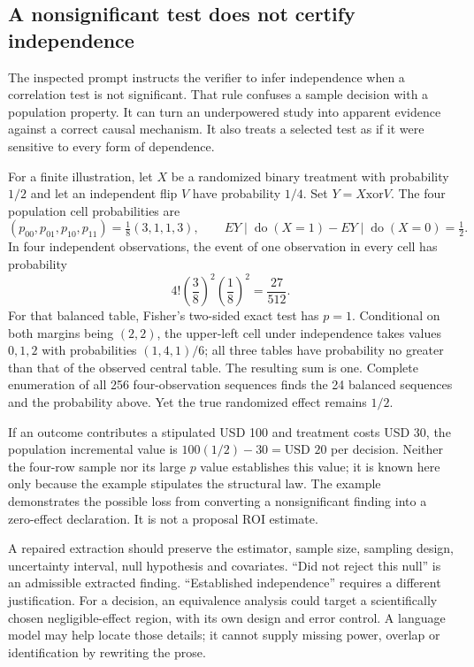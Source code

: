 \subsection{A nonsignificant test does not certify independence}

The inspected prompt instructs the verifier to infer independence when a
correlation test is not significant. That rule confuses a sample decision
with a population property. It can turn an underpowered study into apparent
evidence against a correct causal mechanism. It also treats a selected test
as if it were sensitive to every form of dependence.
\citep{exec17_benchmark_consistency}

For a finite illustration, let $X$ be a randomized binary treatment with
probability $1/2$ and let an independent flip $V$ have probability $1/4$.
Set $Y=X\mathbin{\mathrm{xor}}V$. The four population cell probabilities are
\begin{equation}
 (p_{00},p_{01},p_{10},p_{11})=\tfrac18(3,1,1,3),
 \qquad E{Y\mid\operatorname{do}(X=1)}
       -E{Y\mid\operatorname{do}(X=0)}=\tfrac12.
\label{exec17:validity-binary}
\end{equation}
In four independent observations, the event of one observation in every cell
has probability
\begin{equation}
 4!\left(\frac38\right)^2\left(\frac18\right)^2
       =\frac{27}{512}.
\label{exec17:validity-balanced}
\end{equation}
For that balanced table, Fisher's two-sided exact test has $p=1$. Conditional
on both margins being $(2,2)$, the upper-left cell under independence takes
values $0,1,2$ with probabilities $(1,4,1)/6$; all three tables have probability
no greater than that of the observed central table. The resulting sum is one.
Complete enumeration of all 256 four-observation sequences finds the 24
balanced sequences and the probability above. Yet the true randomized effect
remains $1/2$.~\citep{exec17_advice_validity_exact}

If an outcome contributes a stipulated USD 100 and treatment costs USD 30, the
population incremental value is $100(1/2)-30=\text{USD }20$ per decision.
Neither the four-row sample nor its large $p$ value establishes this value; it
is known here only because the example stipulates the structural law. The
example demonstrates the possible loss from converting a nonsignificant
finding into a zero-effect declaration. It is not a proposal ROI estimate.

A repaired extraction should preserve the estimator, sample size, sampling
design, uncertainty interval, null hypothesis and covariates. ``Did not reject
this null'' is an admissible extracted finding. ``Established independence''
requires a different justification. For a decision, an equivalence analysis
could target a scientifically chosen negligible-effect region, with its own
design and error control. A language model may help locate those details; it
cannot supply missing power, overlap or identification by rewriting the prose.

